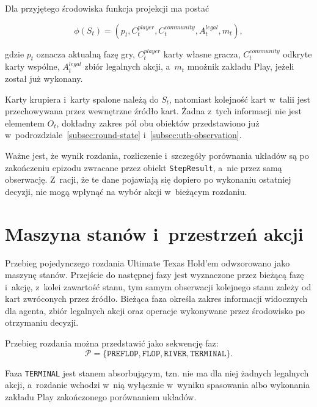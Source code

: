 Dla przyjętego środowiska funkcja projekcji ma postać

\begin{equation}
    \phi(S_t) =
    \left(
        p_t,
        C_t^{player},
        C_t^{community},
        A_t^{legal},
        m_t
    \right),
\end{equation}

gdzie \(p_t\) oznacza aktualną fazę gry, \(C_t^{player}\) karty własne
gracza, \(C_t^{community}\) odkryte karty wspólne, \(A_t^{legal}\) zbiór
legalnych akcji, a~\(m_t\) mnożnik zakładu Play, jeżeli został już
wykonany.

Karty krupiera i~karty spalone należą do \(S_t\), natomiast kolejność
kart w~talii jest przechowywana przez wewnętrzne źródło kart. Żadna
z~tych informacji nie jest elementem \(O_t\), dokładny zakres pól obu
obiektów przedstawiono już w~podrozdziale~\ref{subsec:round-state}
i~\ref{subsec:uth-observation}.

Ważne jest, że wynik rozdania, rozliczenie i~szczegóły porównania układów są po zakończeniu epizodu
zwracane przez obiekt \texttt{StepResult}, a~nie przez samą obserwację.
Z~racji, że te dane pojawiają się dopiero po wykonaniu ostatniej decyzji,
nie mogą wpłynąć na wybór akcji w~bieżącym rozdaniu.

\section{Maszyna stanów i~przestrzeń akcji}
\label{sec:maszyna-stanow}

Przebieg pojedynczego rozdania Ultimate Texas Hold’em odwzorowano jako
maszynę stanów. Przejście do następnej fazy jest wyznaczone przez bieżącą
fazę i~akcję, z~kolei zawartość stanu, tym samym obserwacji kolejnego stanu zależy od kart
zwróconych przez źródło. Bieżąca faza określa zakres informacji
widocznych dla agenta, zbiór legalnych akcji oraz operacje wykonywane przez
środowisko po otrzymaniu decyzji.

Przebieg rozdania można przedstawić jako sekwencję faz:
\begin{equation}
    \mathcal{P} =
    \{
        \texttt{PREFLOP},
        \texttt{FLOP},
        \texttt{RIVER},
        \texttt{TERMINAL}
    \}.
\end{equation}

Faza \texttt{TERMINAL} jest stanem absorbującym, tzn. nie ma dla niej żadnych legalnych
akcji, a~rozdanie wchodzi
w~nią wyłącznie w~wyniku spasowania albo wykonania zakładu Play zakończonego
porównaniem układów.

